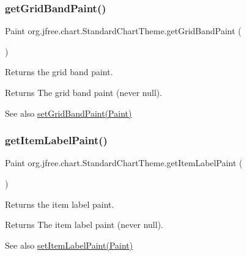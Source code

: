 \subsubsection{\texorpdfstring{get\+Grid\+Band\+Paint()}{getGridBandPaint()}}
{\footnotesize\ttfamily Paint org.\+jfree.\+chart.\+Standard\+Chart\+Theme.\+get\+Grid\+Band\+Paint (\begin{DoxyParamCaption}{ }\end{DoxyParamCaption})}

Returns the grid band paint.

\begin{DoxyReturn}{Returns}
The grid band paint (never {\ttfamily null}).
\end{DoxyReturn}
\begin{DoxySeeAlso}{See also}
\mbox{\hyperlink{classorg_1_1jfree_1_1chart_1_1_standard_chart_theme_a6c4f54c13a6b54deeaca77e4b13e35fd}{set\+Grid\+Band\+Paint(\+Paint)}} 
\end{DoxySeeAlso}
\mbox{\label{classorg_1_1jfree_1_1chart_1_1_standard_chart_theme_ad04edff5df5b061f66f748a20be6a4fe}} 
\subsubsection{\texorpdfstring{get\+Item\+Label\+Paint()}{getItemLabelPaint()}}
{\footnotesize\ttfamily Paint org.\+jfree.\+chart.\+Standard\+Chart\+Theme.\+get\+Item\+Label\+Paint (\begin{DoxyParamCaption}{ }\end{DoxyParamCaption})}

Returns the item label paint.

\begin{DoxyReturn}{Returns}
The item label paint (never {\ttfamily null}).
\end{DoxyReturn}
\begin{DoxySeeAlso}{See also}
\mbox{\hyperlink{classorg_1_1jfree_1_1chart_1_1_standard_chart_theme_a9eacac654f7481bcc9265b81b419f1fb}{set\+Item\+Label\+Paint(\+Paint)}} 
\end{DoxySeeAlso}
\mbox{\label{classorg_1_1jfree_1_1chart_1_1_standard_chart_theme_a0e4aeb2f6b194d7a09d2fbcaa222eb8a}} 
